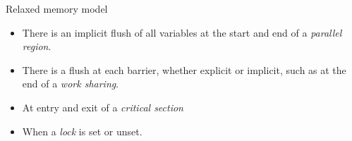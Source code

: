 
  
 {Relaxed memory model}
\label{sec:omp:flush}


\begin{itemize}
\item There is an implicit flush of all variables at the start and end 
  of a \emph{parallel region}.
\item There is a flush at each barrier, whether explicit or implicit,
  such as at the end of a \emph{work sharing}.
\item At entry and exit of a \emph{critical section}
\item When a \emph{lock} is set or unset.
\end{itemize}

